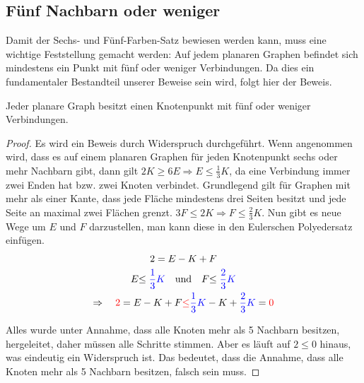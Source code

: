 \subsection{Fünf Nachbarn oder weniger}
Damit der Sechs- und Fünf-Farben-Satz bewiesen werden kann, muss eine wichtige Feststellung gemacht werden: Auf jedem planaren Graphen befindet sich mindestens ein Punkt mit fünf oder weniger Verbindungen. Da dies ein fundamentaler Bestandteil unserer Beweise sein wird, folgt hier der Beweis.
\begin{theorem}
    Jeder planare Graph besitzt einen Knotenpunkt mit fünf oder weniger Verbindungen.
\end{theorem}
\begin{proof}
    Es wird ein Beweis durch Widerspruch durchgeführt. Wenn angenommen wird, dass es auf einem planaren Graphen für jeden Knotenpunkt sechs oder mehr Nachbarn gibt, dann gilt $2K \geq 6E \Rightarrow E \leq \frac{1}{3}K $, da eine Verbindung immer zwei Enden hat bzw. zwei Knoten verbindet. Grundlegend gilt für Graphen mit mehr als einer Kante, dass jede Fläche mindestens drei Seiten besitzt und jede Seite an maximal zwei Flächen grenzt. $3F \leq 2K \Rightarrow F \leq \frac{2}{3}K$. Nun gibt es neue Wege um $E$ und $F$ darzustellen, man kann diese in den Eulerschen Polyedersatz einfügen.
    \begin{gather*}
        2=E-K+F\\
        E{\leq \color{blue}\frac{1}{3}K} \quad \textrm{und} \quad F{\leq \color{blue}\frac{2}{3}K}\\
        \Rightarrow \quad {\color{red} 2}=E-K+F {\color{red} \leq}{\color{blue}\frac{1}{3}K}-K+{\color{blue}\frac{2}{3}K} = {\color{red} 0}
    \end{gather*}
    
    Alles wurde unter Annahme, dass alle Knoten mehr als 5 Nachbarn besitzen, hergeleitet, daher müssen alle Schritte stimmen. Aber es läuft auf $2 \leq 0$ hinaus, was eindeutig ein Widerspruch ist. Das bedeutet, dass die Annahme, dass alle Knoten mehr als 5 Nachbarn besitzen, falsch sein muss.
\end{proof}